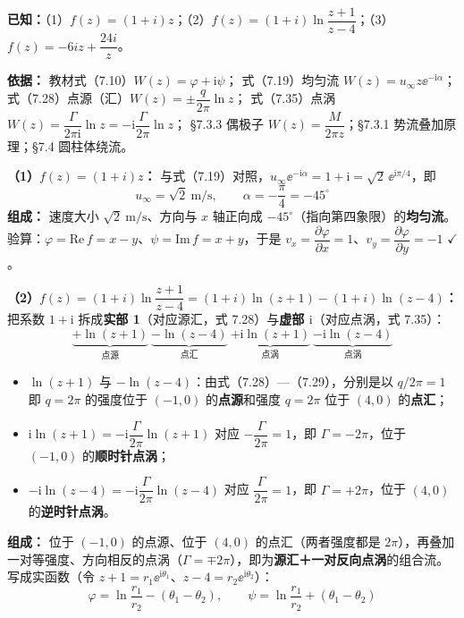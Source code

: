 \begin{jie}
\textbf{已知：}（1）$f(z)=(1+i)z$；（2）$f(z)=(1+i)\ln\dfrac{z+1}{z-4}$；（3）$f(z)=-6iz+\dfrac{24i}{z}$。

\textbf{依据：} 教材式（7.10）$W(z)=\varphi+\mathrm{i}\psi$；
式（7.19）均匀流 $W(z)=u_\infty z\ee^{-\mathrm{i}\alpha}$；
式（7.28）点源（汇）$W(z)=\pm\dfrac{q}{2\pi}\ln z$；
式（7.35）点涡 $W(z)=\dfrac{\Gamma}{2\pi \mathrm{i}}\ln z=-\mathrm{i}\dfrac{\Gamma}{2\pi}\ln z$；
\S7.3.3 偶极子 $W(z)=\dfrac{M}{2\pi z}$；\S7.3.1 势流叠加原理；\S7.4 圆柱体绕流。

\textbf{（1）$f(z)=(1+i)z$：}
与式（7.19）对照，$u_\infty \ee^{-\mathrm{i}\alpha}=1+\mathrm{i}=\sqrt{2}\,\ee^{\mathrm{i}\pi/4}$，即
\[
u_\infty=\sqrt{2}\ \mathrm{m/s},\qquad \alpha=-\frac{\pi}{4}=-45^\circ
\]
\textbf{组成：} 速度大小 $\sqrt{2}\ \mathrm{m/s}$、方向与 $x$ 轴正向成 $-45^\circ$（指向第四象限）的\textbf{均匀流}。
验算：$\varphi=\text{Re}\,f=x-y$、$\psi=\text{Im}\,f=x+y$，于是 $v_x=\dfrac{\partial\varphi}{\partial x}=1$、$v_y=\dfrac{\partial\varphi}{\partial y}=-1$ $\checkmark$。

\textbf{（2）$f(z)=(1+i)\ln\dfrac{z+1}{z-4}=(1+i)\ln(z+1)-(1+i)\ln(z-4)$：}
把系数 $1+\mathrm{i}$ 拆成\textbf{实部 1}（对应源汇，式 7.28）与\textbf{虚部 $\mathrm{i}$}（对应点涡，式 7.35）：
\[
\underbrace{+\ln(z+1)}_{\text{点源}}\ \underbrace{-\ln(z-4)}_{\text{点汇}}\ \underbrace{+\mathrm{i}\ln(z+1)}_{\text{点涡}}\ \underbrace{-\mathrm{i}\ln(z-4)}_{\text{点涡}}
\]
\begin{itemize}
\item $\ln(z+1)$ 与 $-\ln(z-4)$：由式（7.28）—（7.29），分别是以 $q/2\pi=1$ 即 $q=2\pi$ 的强度位于 $(-1,0)$ 的\textbf{点源}和强度 $q=2\pi$ 位于 $(4,0)$ 的\textbf{点汇}；
\item $\mathrm{i}\ln(z+1)=-\mathrm{i}\dfrac{\Gamma}{2\pi}\ln(z+1)$ 对应 $-\dfrac{\Gamma}{2\pi}=1$，即 $\Gamma=-2\pi$，位于 $(-1,0)$ 的\textbf{顺时针点涡}；
\item $-\mathrm{i}\ln(z-4)=-\mathrm{i}\dfrac{\Gamma}{2\pi}\ln(z-4)$ 对应 $\dfrac{\Gamma}{2\pi}=1$，即 $\Gamma=+2\pi$，位于 $(4,0)$ 的\textbf{逆时针点涡}。
\end{itemize}
\textbf{组成：} 位于 $(-1,0)$ 的点源、位于 $(4,0)$ 的点汇（两者强度都是 $2\pi$），再叠加一对等强度、方向相反的点涡（$\Gamma=\mp 2\pi$），即为\textbf{源汇＋一对反向点涡}的组合流。
写成实函数（令 $z+1=r_1\ee^{\mathrm{i}\theta_1}$、$z-4=r_2\ee^{\mathrm{i}\theta_2}$）：
\[
\varphi=\ln\frac{r_1}{r_2}-(\theta_1-\theta_2),\qquad
\psi=\ln\frac{r_1}{r_2}+(\theta_1-\theta_2)
\]


\end{jie}
